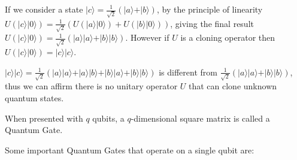 If we consider a state  $\vert c \rangle = \frac{1}{\sqrt{2}}( \vert a \rangle + \vert b \rangle)$, by the principle of linearity $U(\vert c \rangle\vert 0 \rangle)=\frac{1}{\sqrt{2}}( U(\vert a \rangle\vert 0 \rangle) +U(\vert b \rangle\vert 0 \rangle))$, giving the final result $U(\vert c \rangle\vert 0 \rangle)=\frac{1}{\sqrt{2}}( \vert a \rangle\vert a \rangle + \vert b \rangle\vert b \rangle)$. However if $U$ is a cloning operator then $U(\vert c \rangle\vert 0 \rangle)=\vert c \rangle\vert c \rangle$. 

$\vert c \rangle\vert c \rangle = \frac{1}{\sqrt{2}}( \vert a \rangle\vert a \rangle + \vert a \rangle\vert b \rangle+ \vert b \rangle\vert a \rangle+ \vert b \rangle\vert b \rangle)$ is different from $\frac{1}{\sqrt{2}}( \vert a \rangle\vert a \rangle + \vert b \rangle\vert b \rangle)$, thus we can affirm there is no unitary operator $U$ that can clone unknown quantum states\cite{Rieffel2011}.

When presented with $q$ qubits, a $q$-dimensional square matrix is called a Quantum Gate.



Some important Quantum Gates that operate on a single qubit are:

